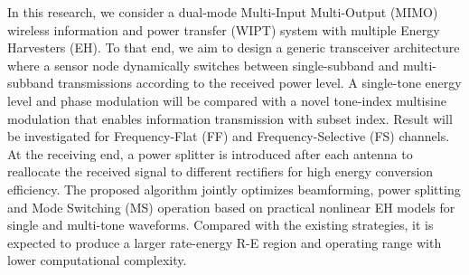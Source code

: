 In this research, we consider a dual-mode Multi-Input Multi-Output (MIMO) wireless information and power transfer (WIPT) system with multiple Energy Harvesters (EH). To that end, we aim to design a generic transceiver architecture where a sensor node dynamically switches between single-subband and multi-subband transmissions according to the received power level. A single-tone energy level and phase modulation will be compared with a novel tone-index multisine modulation that enables information transmission with subset index. Result will be investigated for Frequency-Flat (FF) and Frequency-Selective (FS) channels. At the receiving end, a power splitter is introduced after each antenna to reallocate the received signal to different rectifiers for high energy conversion efficiency. The proposed algorithm jointly optimizes beamforming, power splitting and Mode Switching (MS) operation based on practical nonlinear EH models for single and multi-tone waveforms. Compared with the existing strategies, it is expected to produce a larger rate-energy R-E region and operating range with lower computational complexity.
